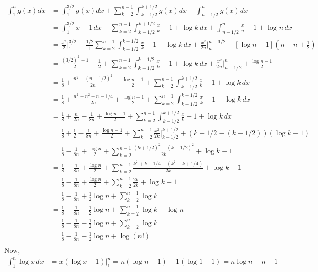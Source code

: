 \documentclass{article}
\begin{document}
\begin{align*}
  \int_{1}^n g(x) dx
  &= \int_{1}^{3/2} g(x) dx + \sum_{k=2}^{n-1} \int_{k-1/2}^{k+1/2} g(x)
    dx + \int_{n-1/2}^n g(x) dx\\
  &= \int_{1}^{3/2} x-1\, dx + \sum_{k=2}^{n-1} \int_{k-1/2}^{k+1/2}
    \frac{x}{k}-1 + \log k\,
    dx + \int_{n-1/2}^n \frac{x}{n}-1+\log n\, dx\\
  &=  \frac{x^2}{2}\bigg|_{1}^{3/2}-\frac{1/2} + \sum_{k=2}^{n-1} \int_{k-1/2}^{k+1/2}
    \frac{x}{k}-1 + \log k\,
    dx + \frac{x^2}{2n}\bigg|_{n}^{n-1/2} +[\log n
    -1]\left(n-n+\frac{1}{2}\right)\\
  &=  \frac{(3/2)^2-1}{2} -\frac{1}{2} + \sum_{k=2}^{n-1} \int_{k-1/2}^{k+1/2}
    \frac{x}{k}-1 + \log k\,
    dx + \frac{x^2}{2n}\bigg|_{n-1/2}^{n} +\frac{\log n
    -1}{2}\\
  &=  \frac{1}{8} + \frac{n^2 - (n-1/2)^2}{2n}-\frac{\log n
    -1}{2} + \sum_{k=2}^{n-1} \int_{k-1/2}^{k+1/2}
    \frac{x}{k}-1 + \log k\,
    dx  \\
  &=  \frac{1}{8} + \frac{n^2 - n^2 +n - 1/4}{2n}+\frac{\log n
    -1}{2} + \sum_{k=2}^{n-1} \int_{k-1/2}^{k+1/2}
    \frac{x}{k}-1 + \log k\,
    dx  \\
  &=  \frac{1}{8} + \frac{n}{2n} - \frac{1}{8n} +\frac{\log n
    -1}{2} + \sum_{k=2}^{n-1} \int_{k-1/2}^{k+1/2}
    \frac{x}{k}-1 + \log k\,
    dx  \\
  &=  \frac{1}{8} + \frac{1}{2} - \frac{1}{8n} +\frac{\log n
    -1}{2}  + \sum_{k=2}^{n-1}
    \frac{x^2}{2k}\bigg|_{k-1/2}^{k+1/2} + (k+1/2-(k-1/2))(\log k-1)
  \\
  &= \frac{1}{8} - \frac{1}{8n} +\frac{\log n}{2} + \sum_{k=2}^{n-1}
    \frac{(k+1/2)^2-(k-1/2)^2}{2k} + \log k-1 \\
  &= \frac{1}{8} - \frac{1}{8n} +\frac{\log n}{2} + \sum_{k=2}^{n-1}
    \frac{k^2+k +1/4 -(k^2-k +1/4)}{2k} + \log k-1 \\
  &= \frac{1}{8} - \frac{1}{8n} +\frac{\log n}{2} + \sum_{k=2}^{n-1}
    \frac{2k}{2k} + \log k-1 \\
&= \frac{1}{8} - \frac{1}{8n} +\frac{1}{2}\log n +
                                  \sum_{k=2}^{n-1}\log k \\
  &= \frac{1}{8} - \frac{1}{8n} -\frac{1}{2}\log n +
    \sum_{k=2}^{n-1}\log k +\log n \\
  &= \frac{1}{8} - \frac{1}{8n} -\frac{1}{2}\log n +
    \sum_{k=2}^{n}\log k \\
  &= \frac{1}{8} - \frac{1}{8n} -\frac{1}{2}\log n +
    \log(n!) \\
\end{align*}
Now,
\begin{align*}
  \int_{1}^n \log x\, dx &= x(\log x -1) \bigg|_{1}^n = n(\log n -1)
  -1(\log 1 -1) =  n\log n -n +1
\end{align*}
\end{document}

